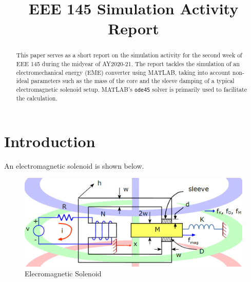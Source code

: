 \documentclass[conference]{IEEEtran}
\begin{document}
\title{EEE 145 Simulation Activity Report}

\author{
}
\maketitle

\begin{abstract}
This paper serves as a short report on the simulation activity for the second week of EEE 145 during the midyear of AY2020-21. The report tackles the simulation of an electromechanical energy (EME) converter using MATLAB, taking into account non-ideal parameters such as the mass of the core and the sleeve damping of a typical electromagnetic solenoid setup. MATLAB's \texttt{ode45} solver is primarily used to facilitate the calculation.

\end{abstract}             

\section{Introduction}

An electromagnetic solenoid is shown below. 
\begin{centering}
\begin{figure}[h]
\includegraphics[scale=0.25]{solenoid.png}
\caption{Elecromagnetic Solenoid}
\end{figure}
\end{centering}
\end{document}
